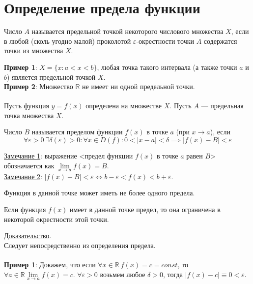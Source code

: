 \documentclass{article}
\begin{document}
    \section{Определение предела функции}
    \begin{definition}
        Число \(A\) называется предельной точкой некоторого числового множества \(X\), если в любой (сколь угодно малой) проколотой \(\varepsilon\)-окрестности точки \(A\) содержатся точки из множества \(X\).  
    \end{definition}   
    \noindent
    \textbf{Пример 1}: \(X = \{x : a < x < b\}\), любая точка такого интервала (а также точки \(a\) и \(b\)) является предельной точкой \(X\).\\
    \textbf{Пример 2}: Множество \(\mathbb{R}\) не имеет ни одной предельной точки.\\ \\
    Пусть функция \(y = f(x)\) определена на множестве \(X\). Пусть \(A\) --- предельная точка множества \(X\).   
    \begin{definition}
        Число \(B\) называется пределом функции \(f(x)\) в точке \(a\) (при \(x \to a\)), если \[\forall \varepsilon > 0\ \exists \delta(\varepsilon) > 0: \forall x \in D(f): 0 < |x - a| < \delta \implies |f(x) - B| < \varepsilon\] 
    \end{definition}
    \noindent
    \underline{Замечание 1}: выражение <предел функции \(f(x)\) в точке \(a\) равен \(B\)> обозначается как \(\lim\limits_{x \to a}f(x) = B\).\\
    \underline{Замечание 2}: \(|f(x) - B| < \varepsilon \iff b - \varepsilon < f(x) < b + \varepsilon\).\\
    \begin{claim} 
        Функция в данной точке может иметь не более одного предела.
    \end{claim}
    \begin{claim} 
        Если функция \(f(x)\) имеет в данной точке предел, то она ограничена в некоторой окрестности этой точки.
    \end{claim}
    \noindent
    \underline{Доказательство}.\\
    Следует непосредственно из определения предела.\\ \\
    \textbf{Пример 1}: 
    Докажем, что если \(\forall x \in \mathbb{R}\ f(x) = c = const\), то \(\forall a \in \mathbb{R} \lim\limits_{x \to a}f(x) = c\).
    \(\forall \varepsilon > 0\) возьмем любое \(\delta > 0\), тогда \(|f(x) - c| \equiv 0 < \varepsilon\).\\ 
\end{document}
